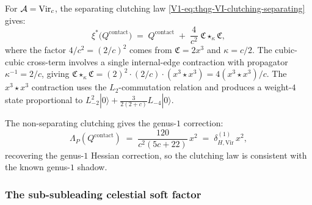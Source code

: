 \begin{computation}
For $\mathcal{A} = \mathrm{Vir}_c$, the separating clutching law
\eqref{V1-eq:thqg-VI-clutching-separating} gives:
\begin{equation}%
\xi^*\bigl(Q^{\mathrm{contact}}\bigr)
\;=\;
Q^{\mathrm{contact}}
\;+\;
\frac{4}{c^2}\;\mathfrak{C} \star_\kappa \mathfrak{C},
\end{equation}
where the factor $4/c^2 = (2/c)^2$ comes from
$\mathfrak{C} = 2x^3$ and $\kappa = c/2$. The cubic-cubic
cross-term involves a single internal-edge contraction with
propagator $\kappa^{-1} = 2/c$, giving
$\mathfrak{C} \star_\kappa \mathfrak{C}
= (2)^2 \cdot (2/c) \cdot (x^3 \star x^3)
= 4(x^3 \star x^3)/c$.
The $x^3 \star x^3$ contraction uses the $L_2$-commutation relation
and produces a weight-$4$ state proportional to
$L_{-2}^2|0\rangle + \tfrac{3}{2(2+c)}L_{-4}|0\rangle$.

The non-separating clutching gives the genus-$1$ correction:
\begin{equation}%
\Lambda_P(Q^{\mathrm{contact}})
\;=\;
\frac{120}{c^2(5c + 22)}\,x^2
\;=\;
\delta_{H,\mathrm{Vir}}^{(1)}\,x^2,
\end{equation}
recovering the genus-$1$ Hessian correction, so the clutching law is consistent with the known genus-$1$
shadow.
\end{computation}

\subsubsection{The sub-subleading celestial soft factor}

